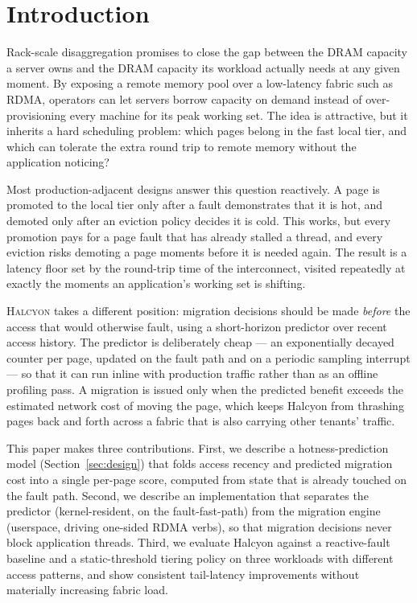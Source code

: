 \section{Introduction}
Rack-scale disaggregation promises to close the gap between the DRAM capacity a server owns and the DRAM capacity its workload actually needs at any given moment. By exposing a remote memory pool over a low-latency fabric such as RDMA, operators can let servers borrow capacity on demand instead of over-provisioning every machine for its peak working set. The idea is attractive, but it inherits a hard scheduling problem: which pages belong in the fast local tier, and which can tolerate the extra round trip to remote memory without the application noticing?

Most production-adjacent designs answer this question reactively. A page is promoted to the local tier only after a fault demonstrates that it is hot, and demoted only after an eviction policy decides it is cold. This works, but every promotion pays for a page fault that has already stalled a thread, and every eviction risks demoting a page moments before it is needed again. The result is a latency floor set by the round-trip time of the interconnect, visited repeatedly at exactly the moments an application's working set is shifting.

\textsc{Halcyon} takes a different position: migration decisions should be made \emph{before} the access that would otherwise fault, using a short-horizon predictor over recent access history. The predictor is deliberately cheap --- an exponentially decayed counter per page, updated on the fault path and on a periodic sampling interrupt --- so that it can run inline with production traffic rather than as an offline profiling pass. A migration is issued only when the predicted benefit exceeds the estimated network cost of moving the page, which keeps Halcyon from thrashing pages back and forth across a fabric that is also carrying other tenants' traffic.

This paper makes three contributions. First, we describe a hotness-prediction model (Section~\ref{sec:design}) that folds access recency and predicted migration cost into a single per-page score, computed from state that is already touched on the fault path. Second, we describe an implementation that separates the predictor (kernel-resident, on the fault-fast-path) from the migration engine (userspace, driving one-sided RDMA verbs), so that migration decisions never block application threads. Third, we evaluate Halcyon against a reactive-fault baseline and a static-threshold tiering policy on three workloads with different access patterns, and show consistent tail-latency improvements without materially increasing fabric load.
